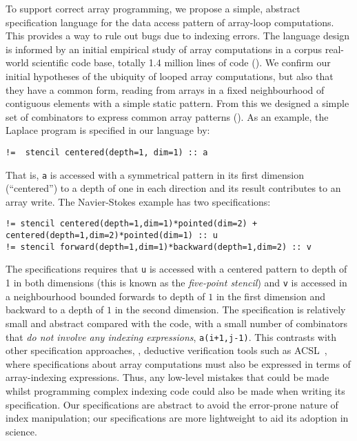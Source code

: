 To support correct array programming, we propose a simple,
abstract specification language for the data access pattern of
array-loop computations. This provides a way to rule out bugs due to
indexing errors. The language design is informed by an initial
empirical study of array computations in a corpus real-world
scientific code base, totally 1.4 million lines of
code (). We confirm our initial hypotheses of the
ubiquity of looped array computations, but also that they have a
common form, reading from arrays in a fixed neighbourhood of
contiguous elements with a simple static pattern. From this we
designed a simple set of combinators to express common array patterns ().
As an example, the Laplace program is specified in our language by:
%
\begin{verbatim}
!=  stencil centered(depth=1, dim=1) :: a
\end{verbatim}
%
That is, \texttt{a} is accessed with a symmetrical pattern in its
first dimension (``centered'') to a depth of one in each direction and
its result contributes to an array
write.  The Navier-Stokes example has two specifications:
%
\begin{verbatim}
!= stencil centered(depth=1,dim=1)*pointed(dim=2) + centered(depth=1,dim=2)*pointed(dim=1) :: u
!= stencil forward(depth=1,dim=1)*backward(depth=1,dim=2) :: v
\end{verbatim}
%
The specifications requires that \texttt{u}
is accessed with a centered pattern to depth of 1 in both dimensions
(this is known as the \emph{five-point stencil}) and \texttt{v} is
accessed in a neighbourhood bounded forwards to depth of $1$ in the
first dimension and backward to a depth of $1$ in the second
dimension. The specification is relatively small and abstract compared
with the code, with a small number of combinators that \emph{do not
  involve any indexing expressions}, \eg{} \texttt{a(i+1,j-1)}. This
contrasts with other specification approaches, \eg{}, deductive
verification tools such as ACSL~\citet{baudin2008acsl}, where
specifications about array computations must also be expressed in
terms of array-indexing expressions. Thus, any low-level mistakes that
could be made whilst programming complex indexing code could also be
made when writing its specification. Our specifications are
abstract to avoid the error-prone nature of index manipulation; our
specifications are more lightweight to aid its adoption in science.

